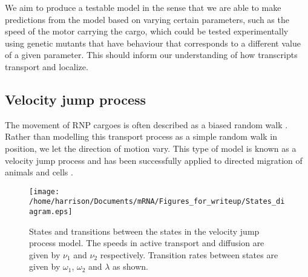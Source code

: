 \documentclass[twocolumn]{biophys}
\begin{document}
We aim to produce a testable model in the sense that we are able to make predictions from the model based on varying certain parameters, such as the speed of the motor carrying the cargo, which could be tested experimentally using genetic mutants that have behaviour that corresponds to a different value of a given parameter. 
This should inform our understanding of how transcripts transport and localize.

\subsection{Velocity jump process} \label{VJ model}
The movement of RNP cargoes is often described as a biased random walk \citep{zimyanin2008vivo}.
Rather than modelling this transport process as a simple random walk in position, we let the direction of motion vary. 
This type of model is known as a velocity jump process and has been successfully applied to directed migration of animals and cells \citep{codling2005calculating, taylorking2015birds}.

\begin{figure}[h]
 \centering
 \texttt{[image: /home/harrison/Documents/mRNA/Figures\_for\_writeup/States\_diagram.eps]}
 \caption{States and transitions between the states in the velocity jump process model. The speeds in active transport and diffusion are given by $\nu_1$ and $\nu_2$ respectively. Transition rates between states are given by $\omega_1$, $\omega_2$ and $\lambda$ as shown.}
 \label{FIG:Phases_of_motion}
\end{figure}
\end{document}
